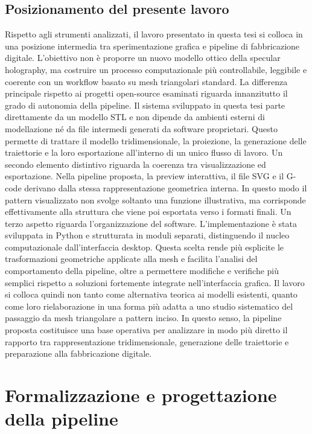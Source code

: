 \documentclass[a4paper,11pt,titlepage,twoside]{book}
\newcommand{\1}{\mathbf{1}}
\numberwithin{equation}{chapter}
\theoremstyle{plain}
\theoremstyle{definition}
\begin{document}
	\section{Posizionamento del presente lavoro}
	
	Rispetto agli strumenti analizzati, il lavoro presentato in questa tesi si colloca in una posizione intermedia tra sperimentazione grafica e pipeline di fabbricazione digitale. L’obiettivo non è proporre un nuovo modello ottico della specular holography, ma costruire un processo computazionale più controllabile, leggibile e coerente con un workflow basato su mesh triangolari standard.
	La differenza principale rispetto ai progetti open-source esaminati riguarda innanzitutto il grado di autonomia della pipeline. Il sistema sviluppato in questa tesi parte direttamente da un modello STL e non dipende da ambienti esterni di modellazione né da file intermedi generati da software proprietari. Questo permette di trattare il modello tridimensionale, la proiezione, la generazione delle traiettorie e la loro esportazione all’interno di un unico flusso di lavoro.
	Un secondo elemento distintivo riguarda la coerenza tra visualizzazione ed esportazione. Nella pipeline proposta, la preview interattiva, il file SVG e il G-code derivano dalla stessa rappresentazione geometrica interna. In questo modo il pattern visualizzato non svolge soltanto una funzione illustrativa, ma corrisponde effettivamente alla struttura che viene poi esportata verso i formati finali.
	Un terzo aspetto riguarda l’organizzazione del software. L’implementazione è stata sviluppata in Python e strutturata in moduli separati, distinguendo il nucleo computazionale dall’interfaccia desktop. Questa scelta rende più esplicite le trasformazioni geometriche applicate alla mesh e facilita l’analisi del comportamento della pipeline, oltre a permettere modifiche e verifiche più semplici rispetto a soluzioni fortemente integrate nell’interfaccia grafica.
	Il lavoro si colloca quindi non tanto come alternativa teorica ai modelli esistenti, quanto come loro rielaborazione in una forma più adatta a uno studio sistematico del passaggio da mesh triangolare a pattern inciso. In questo senso, la pipeline proposta costituisce una base operativa per analizzare in modo più diretto il rapporto tra rappresentazione tridimensionale, generazione delle traiettorie e preparazione alla fabbricazione digitale.
	
	
	\chapter{Formalizzazione e progettazione della pipeline}
	
\end{document}
